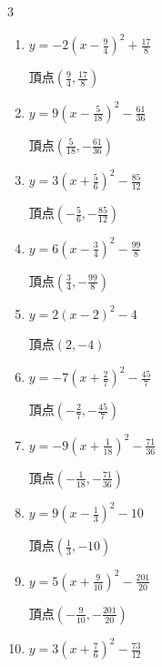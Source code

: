\begin{multicols}{3}
\begin{enumerate}
        $\displaystyle 頂点\left( \frac{1}{2} , 9 \right)$

  \item $\displaystyle y=-2\left( x-\frac{9}{4}\right)^{2}+\frac{17}{8}$

        $\displaystyle 頂点\left( \frac{9}{4} , \frac{17}{8} \right)$

\columnbreak %

\resetques

  \item $\displaystyle y=9\left( x-\frac{5}{18}\right)^{2}-\frac{61}{36}$

        $\displaystyle 頂点\left( \frac{5}{18} , -\frac{61}{36} \right)$

  \item $\displaystyle y=3\left( x+\frac{5}{6}\right)^{2}-\frac{85}{12}$

        $\displaystyle 頂点\left( -\frac{5}{6} , -\frac{85}{12} \right)$

  \item $\displaystyle y=6\left( x-\frac{3}{4}\right)^{2}-\frac{99}{8}$

        $\displaystyle 頂点\left( \frac{3}{4} , -\frac{99}{8} \right)$

  \item $\displaystyle y=2\left( x-2\right)^{2}-4$

        $\displaystyle 頂点\left( 2 , -4 \right)$

  \item $\displaystyle y=-7\left( x+\frac{2}{7}\right)^{2}-\frac{45}{7}$

        $\displaystyle 頂点\left( -\frac{2}{7} , -\frac{45}{7} \right)$

  \item $\displaystyle y=-9\left( x+\frac{1}{18}\right)^{2}-\frac{71}{36}$

        $\displaystyle 頂点\left( -\frac{1}{18} , -\frac{71}{36} \right)$

  \item $\displaystyle y=9\left( x-\frac{1}{3}\right)^{2}-10$

        $\displaystyle 頂点\left( \frac{1}{3} , -10 \right)$

  \item $\displaystyle y=5\left( x+\frac{9}{10}\right)^{2}-\frac{201}{20}$

        $\displaystyle 頂点\left( -\frac{9}{10} , -\frac{201}{20} \right)$

  \item $\displaystyle y=3\left( x+\frac{7}{6}\right)^{2}-\frac{73}{12}$


\end{enumerate}
\end{multicols}
